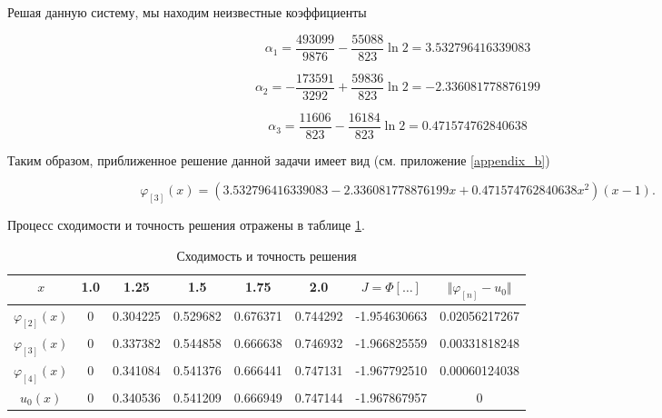 \noindent Решая данную систему, мы находим неизвестные коэффициенты

\begin{displaymath}
	\alpha_{1} = \frac{493099}{9876} - \frac{55088}{823}\ln{2} = 3.532796416339083
\end{displaymath}

\begin{displaymath}
	\alpha_{2} = -\frac{173591}{3292} + \frac{59836}{823}\ln{2} = -2.336081778876199
\end{displaymath}

\begin{displaymath}
	\alpha_{3} = \frac{11606}{823} - \frac{16184}{823}\ln{2} = 0.471574762840638
\end{displaymath}

\noindent Таким образом, приближенное решение данной задачи имеет вид (см. приложение \ref{appendix_b})

\begin{displaymath}
	\varphi_{[3]}(x) = (3.532796416339083 - 2.336081778876199x + 0.471574762840638 x^2)(x-1).
\end{displaymath}

Процесс сходимости и точность решения отражены в таблице \ref{table_process_of_convergence_rank_3}.

\begin{table}[!h]
\centering
\begin{tabular}{|c|c|c|c|c|c|c|c|}
	\hline
	$x$ & 1.0 & 1.25 & 1.5 & 1.75 & 2.0 & $J = \Phi[\ldots]$ & $\Vert \varphi_{[n]} - u_{0} \Vert$ \\
	\hline \hline

	$\varphi_{[2]}(x)$ & 0 & 0.304225 & 0.529682 & 0.676371 & 0.744292 & -1.954630663 & 0.02056217267 \\	\hline
	$\varphi_{[3]}(x)$ & 0 & 0.337382 & 0.544858 & 0.666638 & 0.746932 & -1.966825559 & 0.00331818248 \\	\hline
	$\varphi_{[4]}(x)$ & 
0 & 0.341084 & 0.541376 & 0.666441 & 0.747131 & -1.967792510 & 0.00060124038 \\	\hline
	$u_{0}(x)$ & 0 & 0.340536 & 0.541209 & 0.666949 & 0.747144 & -1.967867957 & 0 \\	\hline

\end{tabular}
\caption{Сходимость и точность решения}
\label{table_process_of_convergence_rank_3}
\end{table}


